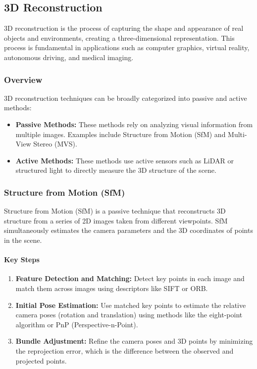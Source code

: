 \documentclass[12pt]{article}
\begin{document}
\subsection{ 3D Reconstruction}

3D reconstruction is the process of capturing the shape and appearance of real objects and environments, creating a three-dimensional representation. This process is fundamental in applications such as computer graphics, virtual reality, autonomous driving, and medical imaging.

\subsubsection{Overview}

3D reconstruction techniques can be broadly categorized into passive and active methods:

\begin{itemize}
    \item \textbf{Passive Methods:} These methods rely on analyzing visual information from multiple images. Examples include Structure from Motion (SfM) and Multi-View Stereo (MVS).
    \item \textbf{Active Methods:} These methods use active sensors such as LiDAR or structured light to directly measure the 3D structure of the scene.
\end{itemize}

\subsubsection{Structure from Motion (SfM)}

Structure from Motion (SfM) is a passive technique that reconstructs 3D structure from a series of 2D images taken from different viewpoints. SfM simultaneously estimates the camera parameters and the 3D coordinates of points in the scene.

\paragraph{Key Steps}

\begin{enumerate}
    \item \textbf{Feature Detection and Matching:} Detect key points in each image and match them across images using descriptors like SIFT or ORB.
    \item \textbf{Initial Pose Estimation:} Use matched key points to estimate the relative camera poses (rotation and translation) using methods like the eight-point algorithm or PnP (Perspective-n-Point).
    \item \textbf{Bundle Adjustment:} Refine the camera poses and 3D points by minimizing the reprojection error, which is the difference between the observed and projected points.
\end{enumerate}
\end{document}
